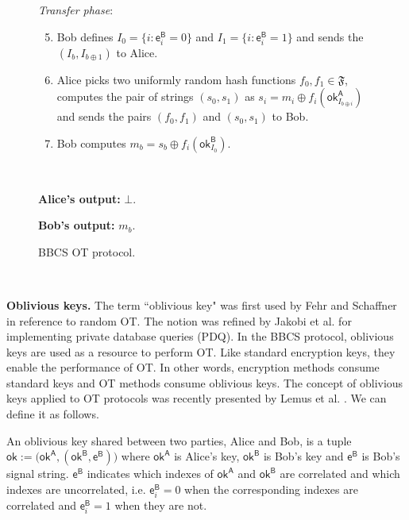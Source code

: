 \begin{figure}[h!]
\begin{tcolorbox}
            \textit{Transfer phase}:
            \begin{enumerate}
            \setcounter{enumi}{4}
                \item Bob defines $I_0 = \{ i : \mathsf{e}^{\mathsf{B}}_i = 0 \}$ and $I_1 = \{ i : \mathsf{e}^{\mathsf{B}}_i = 1 \}$ and sends the $(I_b, I_{b\oplus 1})$ to Alice.
                \item Alice picks two uniformly random hash functions $f_0, f_1 \in \mathfrak{F}$, computes the pair of strings $(s_0, s_1)$ as $s_i = m_i \oplus f_i(\mathsf{ok}^{\mathsf{A}}_{I_{b\oplus i}})$ and sends the pairs $(f_0, f_1)$ and $(s_0, s_1)$ to Bob.
                \item Bob computes $m_b = s_b \oplus  f_i(\mathsf{ok}^{\mathsf{B}}_{I_0})$. 
            \end{enumerate}
            
            \
            
        \textbf{Alice's output:} $\bot$.
        
        \textbf{Bob's output:} $m_b$.
        
        \end{tcolorbox}
    \caption{BBCS OT protocol.}
    \label{fig:BBCS}
\end{figure}

\

\noindent\textbf{Oblivious keys.}  The term ``oblivious key" was first used by Fehr and Schaffner \cite{FS09} in reference to random OT. The notion was refined by Jakobi et al. \cite{JSGBBWZ11} for implementing private database queries (PDQ). In the BBCS protocol, oblivious keys are used as a resource to perform OT. Like standard encryption keys, they enable the performance of OT. In other words, encryption methods consume standard keys and OT methods consume oblivious keys. The concept of oblivious keys applied to OT protocols was recently presented by Lemus et al. \cite{Lemus20}. We can define it as follows.

\begin{definition}
An oblivious key shared between two parties, Alice and Bob, is a tuple $\mathsf{ok}:= \big( \mathsf{ok}^{\mathsf{A}}, (\mathsf{ok}^{\mathsf{B}}, \mathsf{e}^{\mathsf{B}}) \big)$ where $\mathsf{ok}^{\mathsf{A}}$ is Alice's key, $\mathsf{ok}^{\mathsf{B}}$ is Bob's key and $\mathsf{e}^{\mathsf{B}}$ is Bob's signal string. $\mathsf{e}^{\mathsf{B}}$ indicates which indexes of $\mathsf{ok}^{\mathsf{A}}$ and $\mathsf{ok}^{\mathsf{B}}$ are correlated and which indexes are uncorrelated, i.e. $\mathsf{e}^{\mathsf{B}}_i = 0$ when the corresponding indexes are correlated and $\mathsf{e}^{\mathsf{B}}_i = 1$ when they are not.
\label{def:ok}
\end{definition}

